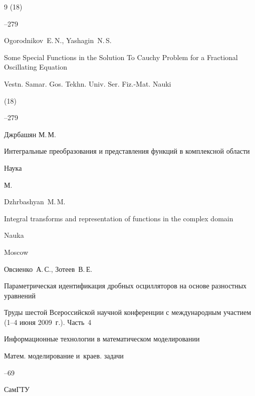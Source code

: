 \begin{thebibliography}{9}
(18)

--279

\misctransl

\by Ogorodnikov~E.\,N., Yashagin~N.\,S.

\paper Some Special Functions in the Solution To Cauchy Problem for a Fractional Oscillating Equation

\jour Vestn. Samar. Gos. Tekhn. Univ. Ser. Fiz.-Mat. Nauki


(18)

--279




\by Джрбашян М.\,М.

\book Интегральные преобразования и представления функций в комплексной области


\publ Наука

\publaddr М.




\misctransl

\by Dzhrbashyan~M.\,M.

\book Integral transforms and representation of functions in the complex domain


\publ Nauka

\publaddr Moscow





\by Овсиенко~А.\,С., Зотеев~В.\,Е.

\paper Параметрическая идентификация дробных осцилляторов на основе разностных уравнений

\inbook Труды шестой Всероссийской научной конференции с международным участием \rm (1--4 июня 2009~г.). Часть~4

\bookinfo Информационные технологии в математическом моделировании

\serial Матем. моделирование и~краев. задачи


--69

\publ СамГТУ


\end{thebibliography}
